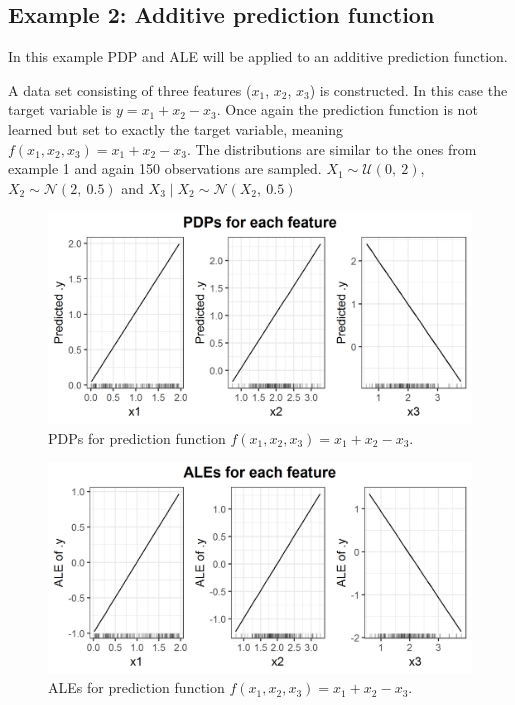 \documentclass[
]{krantz}
\begin{document}
\hypertarget{example-2-additive-prediction-function}{%
\subsection{Example 2: Additive prediction function}\label{example-2-additive-prediction-function}}

In this example PDP and ALE will be applied to an additive prediction function.

A data set consisting of three features (\(x_1\), \(x_2\), \(x_3\)) is constructed. In this case the target variable is \(y = x_1 + x_2 - x_3\). Once again the prediction function is not learned but set to exactly the target variable, meaning \(f(x_1, x_2, x_3) = x_1 + x_2 - x_3\).
The distributions are similar to the ones from example 1 and again 150 observations are sampled.
\(X_1 \sim \mathcal{U}(0,~2)\), \(X_2 \sim \mathcal{N}(2,~0.5)\) and \(X_3\mid X_2 \sim \mathcal{N}(X_2,~0.5)\)

\begin{figure}
\includegraphics[width=1\linewidth]{images/ale_1_PDPs_x1_plus_x2_minus_x3_150_0_2_0p5} \caption{PDPs for prediction function \(f(x_1, x_2, x_3) = x_1 + x_2 - x_3\).}\label{fig:pdpsx1px2mx3}
\end{figure}



\begin{figure}
\includegraphics[width=1\linewidth]{images/ale_1_ALEs_x1_plus_x2_minus_x3_150_0_2_0p5} \caption{ALEs for prediction function \(f(x_1, x_2, x_3) = x_1 + x_2 - x_3\).}\label{fig:alesx1px2mx3}
\end{figure}
\end{document}
